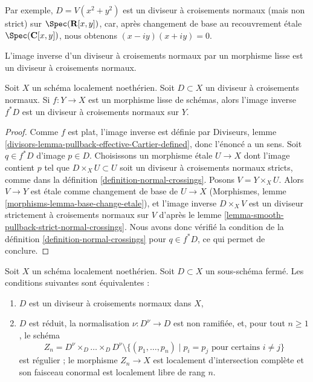 \noindent
Par exemple, $D = V(x^2 + y^2)$ est un diviseur à croisements normaux
(mais non strict) sur
$\Spec(\mathbf{R}[x, y])$, car, après changement de base au
recouvrement \'etale $\Spec(\mathbf{C}[x, y])$, nous obtenons $(x - iy)(x + iy) = 0$.

\begin{lemma}
\label{lemma-smooth-pullback-normal-crossings}
\begin{slogan}
L'image inverse d'un diviseur à croisements normaux par un morphisme
lisse est un diviseur à croisements normaux.
\end{slogan}
Soit $X$ un schéma localement noethérien. Soit $D \subset X$ un
diviseur à croisements normaux. Si $f : Y \to X$ est un morphisme
lisse de schémas, alors l'image inverse $f^*D$ est un
diviseur à croisements normaux sur $Y$.
\end{lemma}

\begin{proof}
Comme $f$ est plat, l'image inverse est définie par
Diviseurs, lemme \ref{divisors-lemma-pullback-effective-Cartier-defined},
donc l'énoncé a un sens.
Soit $q \in f^*D$ d'image $p \in D$.
Choisissons un morphisme \'etale $U \to X$ dont l'image contient $p$
tel que $D \times_X U \subset U$ soit un diviseur à croisements normaux
stricts, comme dans la définition \ref{definition-normal-crossings}.
Posons $V = Y \times_X U$. Alors $V \to Y$ est \'etale comme changement
de base de $U \to X$
(Morphismes, lemme \ref{morphisms-lemma-base-change-etale}),
et l'image inverse $D \times_X V$ est un diviseur strictement à croisements
normaux sur $V$ d'après le lemme \ref{lemma-smooth-pullback-strict-normal-crossings}.
Nous avons donc vérifié la condition de la
définition \ref{definition-normal-crossings}
pour $q \in f^*D$, ce qui permet de conclure.
\end{proof}

\begin{lemma}
\label{lemma-characterize-normal-crossings-normalization}
Soit $X$ un schéma localement noethérien. Soit $D \subset X$ un sous-schéma
fermé. Les conditions suivantes sont équivalentes :
\begin{enumerate}
\item $D$ est un diviseur à croisements normaux dans $X$,
\item $D$ est réduit, la normalisation $\nu : D^\nu \to D$ est non ramifiée,
et, pour tout $n \geq 1$, le schéma
$$
Z_n = D^\nu \times_D \ldots \times_D D^\nu
\setminus \{(p_1, \ldots, p_n) \mid p_i = p_j\text{ pour certains }i\not = j\}
$$
est régulier ; le morphisme $Z_n \to X$ est localement d'intersection complète
et son faisceau conormal est localement libre de rang $n$.
\end{enumerate}
\end{lemma}

